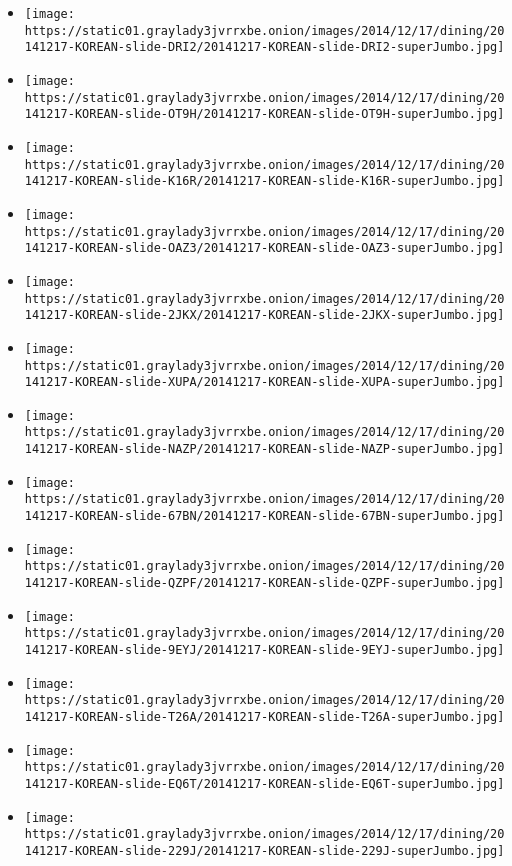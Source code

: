 \begin{itemize}
\item
  \texttt{[image: https://static01.graylady3jvrrxbe.onion/images/2014/12/17/dining/20141217-KOREAN-slide-DRI2/20141217-KOREAN-slide-DRI2-superJumbo.jpg]}
\item
  \texttt{[image: https://static01.graylady3jvrrxbe.onion/images/2014/12/17/dining/20141217-KOREAN-slide-OT9H/20141217-KOREAN-slide-OT9H-superJumbo.jpg]}
\item
  \texttt{[image: https://static01.graylady3jvrrxbe.onion/images/2014/12/17/dining/20141217-KOREAN-slide-K16R/20141217-KOREAN-slide-K16R-superJumbo.jpg]}
\item
  \texttt{[image: https://static01.graylady3jvrrxbe.onion/images/2014/12/17/dining/20141217-KOREAN-slide-OAZ3/20141217-KOREAN-slide-OAZ3-superJumbo.jpg]}
\item
  \texttt{[image: https://static01.graylady3jvrrxbe.onion/images/2014/12/17/dining/20141217-KOREAN-slide-2JKX/20141217-KOREAN-slide-2JKX-superJumbo.jpg]}
\item
  \texttt{[image: https://static01.graylady3jvrrxbe.onion/images/2014/12/17/dining/20141217-KOREAN-slide-XUPA/20141217-KOREAN-slide-XUPA-superJumbo.jpg]}
\item
  \texttt{[image: https://static01.graylady3jvrrxbe.onion/images/2014/12/17/dining/20141217-KOREAN-slide-NAZP/20141217-KOREAN-slide-NAZP-superJumbo.jpg]}
\item
  \texttt{[image: https://static01.graylady3jvrrxbe.onion/images/2014/12/17/dining/20141217-KOREAN-slide-67BN/20141217-KOREAN-slide-67BN-superJumbo.jpg]}
\item
  \texttt{[image: https://static01.graylady3jvrrxbe.onion/images/2014/12/17/dining/20141217-KOREAN-slide-QZPF/20141217-KOREAN-slide-QZPF-superJumbo.jpg]}
\item
  \texttt{[image: https://static01.graylady3jvrrxbe.onion/images/2014/12/17/dining/20141217-KOREAN-slide-9EYJ/20141217-KOREAN-slide-9EYJ-superJumbo.jpg]}
\item
  \texttt{[image: https://static01.graylady3jvrrxbe.onion/images/2014/12/17/dining/20141217-KOREAN-slide-T26A/20141217-KOREAN-slide-T26A-superJumbo.jpg]}
\item
  \texttt{[image: https://static01.graylady3jvrrxbe.onion/images/2014/12/17/dining/20141217-KOREAN-slide-EQ6T/20141217-KOREAN-slide-EQ6T-superJumbo.jpg]}
\item
  \texttt{[image: https://static01.graylady3jvrrxbe.onion/images/2014/12/17/dining/20141217-KOREAN-slide-229J/20141217-KOREAN-slide-229J-superJumbo.jpg]}

\end{itemize}
